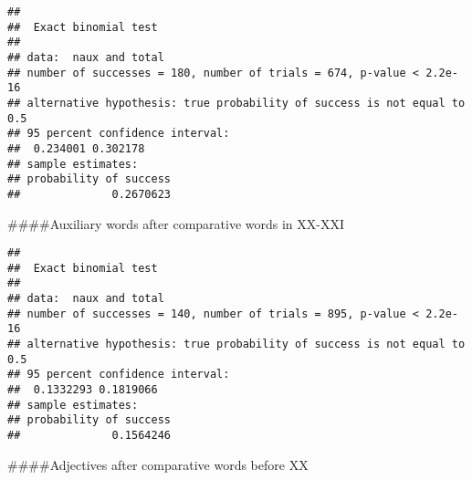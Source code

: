 \documentclass[
]{article}
\newenvironment{Shaded}{\begin{snugshade}}{\end{snugshade}}
\newcommand{\DecValTok}[1]{\textcolor[rgb]{0.00,0.00,0.81}{#1}}
\newcommand{\KeywordTok}[1]{\textcolor[rgb]{0.13,0.29,0.53}{\textbf{#1}}}
\newcommand{\NormalTok}[1]{#1}
\newcommand{\OperatorTok}[1]{\textcolor[rgb]{0.81,0.36,0.00}{\textbf{#1}}}
\newcommand{\StringTok}[1]{\textcolor[rgb]{0.31,0.60,0.02}{#1}}
\begin{document}
\begin{verbatim}
## 
##  Exact binomial test
## 
## data:  naux and total
## number of successes = 180, number of trials = 674, p-value < 2.2e-16
## alternative hypothesis: true probability of success is not equal to 0.5
## 95 percent confidence interval:
##  0.234001 0.302178
## sample estimates:
## probability of success 
##              0.2670623
\end{verbatim}

\#\#\#\#Auxiliary words after comparative words in XX-XXI

\begin{Shaded}
\end{Shaded}

\begin{verbatim}
## 
##  Exact binomial test
## 
## data:  naux and total
## number of successes = 140, number of trials = 895, p-value < 2.2e-16
## alternative hypothesis: true probability of success is not equal to 0.5
## 95 percent confidence interval:
##  0.1332293 0.1819066
## sample estimates:
## probability of success 
##              0.1564246
\end{verbatim}

\#\#\#\#Adjectives after comparative words before XX

\begin{Shaded}
\end{Shaded}
\end{document}
